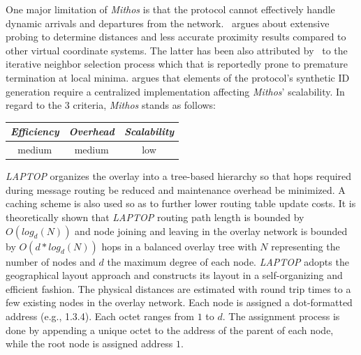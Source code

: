 One major limitation of \emph{Mithos} is that the protocol cannot effectively
handle dynamic arrivals and departures from the network. 
\cite{CCRK2004}~argues about extensive probing to determine 
distances and less accurate proximity results compared to other
virtual coordinate systems. The latter has been also attributed
by~\cite{WSS2005} to the iterative neighbor selection process which that is 
reportedly prone to premature termination at local minima.
\cite{cox_vivaldi_2004} argues that elements of the protocol's
synthetic ID generation require a centralized implementation 
affecting \emph{Mithos}' scalability.
In regard to the $3$ criteria, \emph{Mithos} stands as follows:
\begin{center}
{\footnotesize
\begin{tabular}{ccc}
\emph{Efficiency} & \emph{Overhead} & \emph{Scalability} \\
\hline
medium &
medium &
low
\end{tabular}
}
\end{center}

%
\emph{LAPTOP} \cite{WLH2007} organizes the overlay 
into a tree-based hierarchy so that 
hops required during message routing be reduced and 
maintenance overhead be minimized.
A caching scheme is also used so as
to further lower routing table update costs. 
It is theoretically shown that 
\emph{LAPTOP} routing path length is bounded by $O(log_d(N))$ and node
joining and leaving in the overlay network is bounded by
$O(d*log_d(N))$ hops in a balanced overlay tree with $N$ representing the
number of nodes and $d$ the maximum degree of each node. 
\emph{LAPTOP} adopts the geographical layout approach  
and constructs its layout in a self-organizing and 
efficient fashion. 
The physical distances are estimated
with round trip times to a few existing nodes in the overlay network.
Each node is assigned a dot-formatted address (e.g., 1.3.4). 
Each octet ranges from
$1$ to $d$.
The assignment process is done by appending a unique octet 
to the address of the parent of each node, while
the root node is assigned address $1$.


